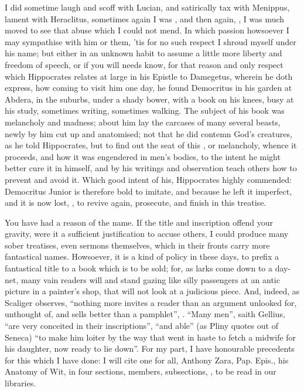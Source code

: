 I did sometime laugh and scoff with Lucian, and satirically tax with Menippus,
lament with Heraclitus, sometimes again I was , and then again, , I was much moved to see that abuse which I
could not mend. In which passion howsoever I may sympathise with him or them,
'tis for no such respect I shroud myself under his name; but either in an
unknown habit to assume a little more liberty and freedom of speech, or if you
will needs know, for that reason and only respect which Hippocrates relates at
large in his Epistle to Damegetus, wherein he doth express, how coming to visit
him one day, he found Democritus in his garden at Abdera, in the suburbs,
under a shady bower, with a book on his
knees, busy at his study, sometimes writing, sometimes walking. The subject of
his book was melancholy and madness; about him lay the carcases of many several
beasts, newly by him cut up and anatomised; not that he did contemn God's
creatures, as he told Hippocrates, but to find out the seat of this , or melancholy, whence it proceeds, and how it was engendered in men's
bodies, to the intent he might better cure it in himself, and by his writings
and observation teach others how to prevent and avoid it.
Which good intent of his, Hippocrates highly commended: Democritus Junior is
therefore bold to imitate, and because he left it imperfect, and it is now
lost, , to revive again, prosecute, and
finish in this treatise.

You have had a reason of the name. If the title and inscription offend your
gravity, were it a sufficient justification to accuse others, I could produce
many sober treatises, even sermons themselves, which in their fronts carry more
fantastical names. Howsoever, it is a kind of policy in these days, to prefix a
fantastical title to a book which is to be sold; for, as larks come down to a
day-net, many vain readers will  and stand gazing like
silly passengers at an antic picture in a painter's shop, that will not look at
a judicious piece. And, indeed, as Scaliger observes,
\enquote{nothing more invites a reader than an argument unlooked for, unthought of, and
sells better than a  pamphlet}, . \enquote{Many men}, saith
Gellius, \enquote{are very conceited in their inscriptions}, \enquote{and able} (as
Pliny quotes out of Seneca) \enquote{to make him loiter by the way
that went in haste to fetch a midwife for his daughter, now ready to lie down}.
For my part, I have honourable precedents for this which I
have done: I will cite one for all, Anthony Zara, Pap. Epis., his Anatomy of
Wit, in four sections, members, subsections, \etc{}, to be read in our
libraries.

